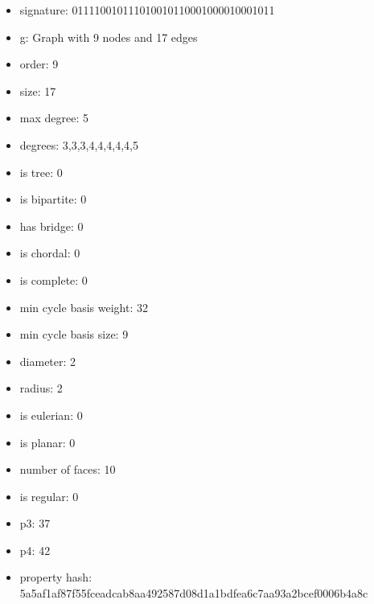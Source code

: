 \newpage
\begin{figure}
\end{figure}
\begin{itemize}
\item signature: 011110010111010010110001000010001011
\item g: Graph with 9 nodes and 17 edges
\item order: 9
\item size: 17
\item max degree: 5
\item degrees: 3,3,3,4,4,4,4,4,5
\item is tree: 0
\item is bipartite: 0
\item has bridge: 0
\item is chordal: 0
\item is complete: 0
\item min cycle basis weight: 32
\item min cycle basis size: 9
\item diameter: 2
\item radius: 2
\item is eulerian: 0
\item is planar: 0
\item number of faces: 10
\item is regular: 0
\item p3: 37
\item p4: 42
\item property hash: 5a5af1af87f55fceadcab8aa492587d08d1a1bdfea6c7aa93a2bcef0006b4a8c
\end{itemize}
